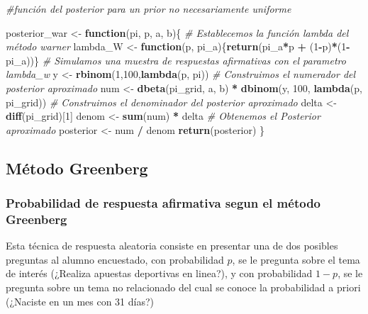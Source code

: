 \documentclass[
]{article}
\newenvironment{Shaded}{\begin{snugshade}}{\end{snugshade}}
\newcommand{\CommentTok}[1]{\textcolor[rgb]{0.56,0.35,0.01}{\textit{#1}}}
\newcommand{\ControlFlowTok}[1]{\textcolor[rgb]{0.13,0.29,0.53}{\textbf{#1}}}
\newcommand{\DecValTok}[1]{\textcolor[rgb]{0.00,0.00,0.81}{#1}}
\newcommand{\FunctionTok}[1]{\textcolor[rgb]{0.13,0.29,0.53}{\textbf{#1}}}
\newcommand{\NormalTok}[1]{#1}
\newcommand{\OtherTok}[1]{\textcolor[rgb]{0.56,0.35,0.01}{#1}}
\newcommand{\SpecialCharTok}[1]{\textcolor[rgb]{0.81,0.36,0.00}{\textbf{#1}}}
\begin{document}
\begin{Shaded}
\begin{Highlighting}[]
\CommentTok{\#función del posterior para un prior no necesariamente uniforme}

\NormalTok{posterior\_war }\OtherTok{\textless{}{-}} \ControlFlowTok{function}\NormalTok{(pi, p, a, b)\{}
  \CommentTok{\# Establecemos la función lambda del método warner}
\NormalTok{  lambda\_W }\OtherTok{\textless{}{-}} \ControlFlowTok{function}\NormalTok{(p, pi\_a)\{}\FunctionTok{return}\NormalTok{(pi\_a}\SpecialCharTok{*}\NormalTok{p }\SpecialCharTok{+}\NormalTok{ (}\DecValTok{1}\SpecialCharTok{{-}}\NormalTok{p)}\SpecialCharTok{*}\NormalTok{(}\DecValTok{1}\SpecialCharTok{{-}}\NormalTok{pi\_a))\}}
  \CommentTok{\# Simulamos una muestra de respuestas afirmativas con el parametro lambda\_w}
\NormalTok{  y }\OtherTok{\textless{}{-}} \FunctionTok{rbinom}\NormalTok{(}\DecValTok{1}\NormalTok{,}\DecValTok{100}\NormalTok{,}\FunctionTok{lambda}\NormalTok{(p, pi))}
  \CommentTok{\# Construimos el numerador del posterior aproximado}
\NormalTok{  num }\OtherTok{\textless{}{-}} \FunctionTok{dbeta}\NormalTok{(pi\_grid, a, b) }\SpecialCharTok{*} \FunctionTok{dbinom}\NormalTok{(y, }\DecValTok{100}\NormalTok{, }\FunctionTok{lambda}\NormalTok{(p, pi\_grid))}
  \CommentTok{\# Construimos el denominador del posterior aproximado}
\NormalTok{  delta }\OtherTok{\textless{}{-}} \FunctionTok{diff}\NormalTok{(pi\_grid)[}\DecValTok{1}\NormalTok{] }
\NormalTok{  denom }\OtherTok{\textless{}{-}} \FunctionTok{sum}\NormalTok{(num) }\SpecialCharTok{*}\NormalTok{ delta}
  \CommentTok{\# Obtenemos el Posterior aproximado}
\NormalTok{  posterior }\OtherTok{\textless{}{-}}\NormalTok{ num }\SpecialCharTok{/}\NormalTok{ denom}
  \FunctionTok{return}\NormalTok{(posterior)}
\NormalTok{\}}
\end{Highlighting}
\end{Shaded}

\newpage

\subsection{Método Greenberg}\label{Objetivo-3}

\subsubsection{Probabilidad de respuesta afirmativa segun el método Greenberg}\label{subtitulo-10}

Esta técnica de respuesta aleatoria consiste en presentar una de dos
posibles preguntas al alumno encuestado, con probabilidad \(p\), se le
pregunta sobre el tema de interés (¿Realiza apuestas deportivas en
linea?), y con probabilidad \(1-p\), se le pregunta sobre un tema no
relacionado del cual se conoce la probabilidad a priori (¿Naciste en un
mes con 31 días?)
\end{document}
